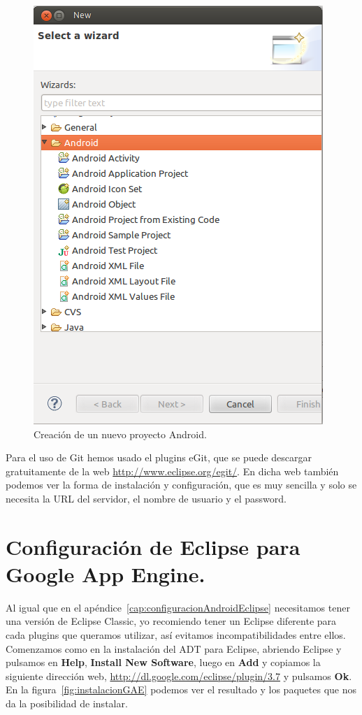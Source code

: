 \begin{figure}
  \centering
    \includegraphics[scale=0.6]{./ConfiguracionEclipse/imagenes/nuevoProyectoAndroid.png}
  \caption{Creación de un nuevo proyecto Android.}
  \label{fig:nuevoProyectoAndroid}
\end{figure}

Para el uso de Git hemos usado el plugins eGit, que se puede descargar gratuitamente de la web \url{http://www.eclipse.org/egit/}. En dicha web también podemos ver la forma de instalación y configuración, que es muy sencilla y solo se necesita la URL del servidor, el nombre de usuario y el password.

\section{Configuración de Eclipse para Google App Engine.}\label{cap:configuracionGAEEclipse}

Al igual que en el apéndice~\ref{cap:configuracionAndroidEclipse} necesitamos tener una versión de Eclipse Classic, yo recomiendo tener un Eclipse diferente para cada plugins que queramos utilizar, así evitamos incompatibilidades entre ellos. Comenzamos como en la instalación del ADT para Eclipse, abriendo Eclipse y pulsamos en \textbf{Help}, \textbf{Install New Software}, luego en \textbf{Add} y copiamos la siguiente dirección web, \url{http://dl.google.com/eclipse/plugin/3.7} y pulsamos \textbf{Ok}. En la figura~\ref{fig:instalacionGAE} podemos ver el resultado y los paquetes que nos da la posibilidad de instalar.

